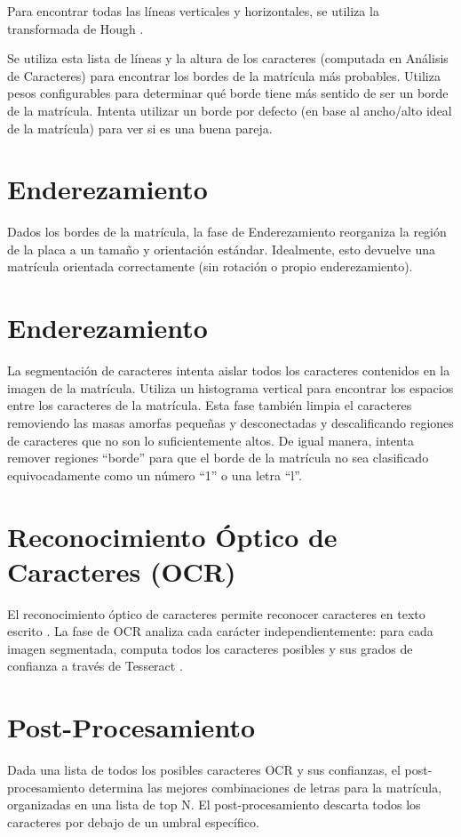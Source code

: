 Para encontrar todas las líneas verticales y horizontales, se utiliza la transformada de Hough \cite{OpenCV2016-kr}.

Se utiliza esta lista de líneas y la altura de los caracteres (computada en Análisis de Caracteres) para encontrar los bordes de la matrícula más probables. Utiliza pesos configurables para determinar qué borde tiene más sentido de ser un borde de la matrícula. Intenta utilizar un borde por defecto (en base al ancho/alto ideal de la matrícula) para ver si es una buena pareja.

\section{Enderezamiento}
Dados los bordes de la matrícula, la fase de Enderezamiento reorganiza la región de la placa a un tamaño y orientación estándar. Idealmente, esto devuelve una matrícula orientada correctamente (sin rotación o propio enderezamiento).

\section{Enderezamiento}
La segmentación de caracteres intenta aislar todos los caracteres contenidos en la imagen de la matrícula. Utiliza un histograma vertical para encontrar los espacios entre los caracteres de la matrícula. Esta fase también limpia el caracteres removiendo las masas amorfas pequeñas y desconectadas y descalificando regiones de caracteres que no son lo suficientemente altos. De igual manera, intenta remover regiones “borde” para que el borde de la matrícula no sea clasificado equivocadamente como un número “1” o una letra “l”. 

\section{Reconocimiento Óptico de Caracteres (OCR)}
El reconocimiento óptico de caracteres permite reconocer caracteres en texto escrito \cite{Mithe2013-yn}. La fase de OCR analiza cada carácter independientemente: para cada imagen segmentada, computa todos los caracteres posibles  y sus grados de confianza a través de Tesseract \cite{Tesseract-OCR2016-fe}.
\section{Post-Procesamiento}
Dada una lista de todos los posibles caracteres OCR y sus confianzas, el post-procesamiento determina las mejores combinaciones de letras para la matrícula, organizadas en una lista de top N. El post-procesamiento descarta todos los caracteres por debajo de un umbral específico. 

